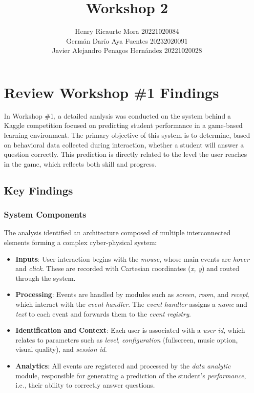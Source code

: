 \documentclass{article}
\title{Workshop 2}
\author{
Henry Ricaurte Mora 20221020084 \\
Germán Darío Aya Fuentes 20232020091 \\
Javier Alejandro Penagos Hernández 20221020028
}
\date{}
\begin{document}
\maketitle

\section{Review Workshop {\#}1 Findings}

In Workshop \#1, a detailed analysis was conducted on the system behind a Kaggle competition focused on predicting student performance in a game-based learning environment. The primary objective of this system is to determine, based on behavioral data collected during interaction, whether a student will answer a question correctly. This prediction is directly related to the level the user reaches in the game, which reflects both skill and progress.

\subsection*{Key Findings}

\subsubsection*{System Components}

The analysis identified an architecture composed of multiple interconnected elements forming a complex cyber-physical system:

\begin{itemize}
    \item \textbf{Inputs}: User interaction begins with the \textit{mouse}, whose main events are \textit{hover} and \textit{click}. These are recorded with Cartesian coordinates (\textit{x, y}) and routed through the system.
    
    \item \textbf{Processing}: Events are handled by modules such as \textit{screen}, \textit{room}, and \textit{recept}, which interact with the \textit{event handler}. The \textit{event handler} assigns a \textit{name} and \textit{text} to each event and forwards them to the \textit{event registry}.
    
    \item \textbf{Identification and Context}: Each user is associated with a \textit{user id}, which relates to parameters such as \textit{level}, \textit{configuration} (fullscreen, music option, visual quality), and \textit{session id}.
    
    \item \textbf{Analytics}: All events are registered and processed by the \textit{data analytic} module, responsible for generating a prediction of the student’s \textit{performance}, i.e., their ability to correctly answer questions.
\end{itemize}
\end{document}
